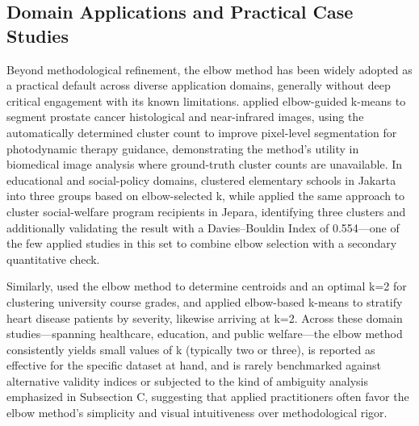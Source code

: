 \subsection{Domain Applications and Practical Case Studies}
Beyond methodological refinement, the elbow method has been widely adopted as a practical default across diverse application domains, generally without deep critical engagement with its known limitations. \cite{sammouda2021optimized} applied elbow-guided k-means to segment prostate cancer histological and near-infrared images, using the automatically determined cluster count to improve pixel-level segmentation for photodynamic therapy guidance, demonstrating the method's utility in biomedical image analysis where ground-truth cluster counts are unavailable. In educational and social-policy domains, \cite{permadi2023means} clustered elementary schools in Jakarta into three groups based on elbow-selected k, while \cite{maori2023metode} applied the same approach to cluster social-welfare program recipients in Jepara, identifying three clusters and additionally validating the result with a Davies--Bouldin Index of 0.554---one of the few applied studies in this set to combine elbow selection with a secondary quantitative check.

Similarly, \cite{ghifari2023clustering} used the elbow method to determine centroids and an optimal k=2 for clustering university course grades, and \cite{wala2024heart} applied elbow-based k-means to stratify heart disease patients by severity, likewise arriving at k=2. Across these domain studies---spanning healthcare, education, and public welfare---the elbow method consistently yields small values of k (typically two or three), is reported as effective for the specific dataset at hand, and is rarely benchmarked against alternative validity indices or subjected to the kind of ambiguity analysis emphasized in Subsection C, suggesting that applied practitioners often favor the elbow method's simplicity and visual intuitiveness over methodological rigor.

